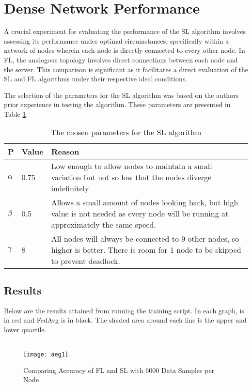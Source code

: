 \section{Dense Network Performance}
A crucial experiment for evaluating the performance of the SL algorithm involves assessing its performance under optimal circumstances, specifically within a network of nodes wherein each node is directly connected to every other node. In FL, the analogous topology involves direct connections between each node and the server. This comparison is significant as it facilitates a direct evaluation of the SL and FL algorithms under their respective ideal conditions.

The selection of the parameters for the SL algorithm was based on the authors prior experience in testing the algorithm. These parameters are presented in Table \ref{slparamsDNP}.
\begin{table}[H]
	\begin{tabular}{p{0.5cm}|l|p{11cm}}
		P & Value & Reason \\ \hline \hline
		$\alpha$  & 0.75  & Low enough to allow nodes to maintain a small variation but not so low that the nodes diverge indefinitely                               \\ \hline
		$\beta$   & 0.5   & Allows a small amount of nodes looking back, but high value is not needed as every node will be running at approximately the same speed. \\ \hline
		$\gamma$  & 8     & All nodes will always be connected to 9 other nodes, so higher is better. There is room for 1 node to be skipped to prevent deadlock.   
	\end{tabular}
	\caption{The chosen parameters for the SL algorithm} \label{slparamsDNP}
\end{table}

\subsection{Results}
Below are the results attained from running the training script. In each graph, \SL is in red and FedAvg is in black. The shaded area around each line is the upper and lower quartile.

\begin{figure}[H] 
	 \\
	\texttt{[image: aeg1]}
	\caption{Comparing Accuracy of FL and SL with 6000 Data Samples per Node}
	\label{aeg1}
\end{figure}

